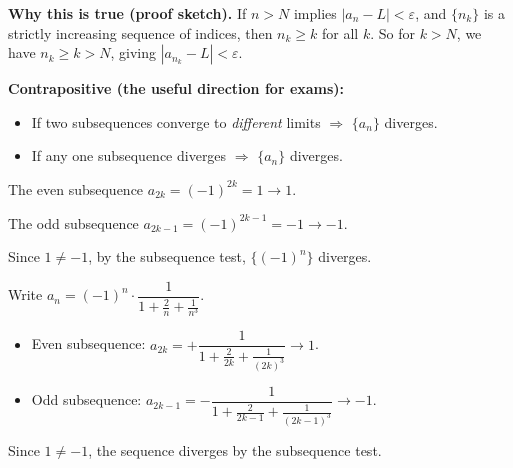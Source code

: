 \noindent
\textbf{Why this is true (proof sketch).}
If $n>N$ implies $|a_n-L|<\varepsilon$, and $\{n_k\}$ is a strictly increasing sequence of indices, then $n_k\ge k$ for all $k$.
So for $k>N$, we have $n_k\ge k>N$, giving $|a_{n_k}-L|<\varepsilon$.

\noindent
\textbf{Contrapositive (the useful direction for exams):}

\begin{itemize}[leftmargin=*]
\item If two subsequences converge to \emph{different} limits $\Rightarrow$ $\{a_n\}$ diverges.
\item If any one subsequence diverges $\Rightarrow$ $\{a_n\}$ diverges.
\end{itemize}

\begin{examplebox}[title={Worked Example: $\{(-1)^n\}$ diverges (Lecture Example 4.4)}]

The even subsequence $a_{2k}=(-1)^{2k}=1\to 1$.

The odd subsequence $a_{2k-1}=(-1)^{2k-1}=-1\to -1$.

Since $1\ne -1$, by the subsequence test, $\{(-1)^n\}$ diverges.

\end{examplebox}

\begin{examplebox}[title={Worked Example (Tutorial 7, Question 2(vii)): subsequence test for $\frac{(-1)^n n^3}{n^3+2n^2+1}$}]

Write $a_n=(-1)^n\cdot \dfrac{1}{1+\frac{2}{n}+\frac{1}{n^3}}$.

\begin{itemize}[leftmargin=*]
\item Even subsequence: $a_{2k}=+\dfrac{1}{1+\frac{2}{2k}+\frac{1}{(2k)^3}}\to 1$.
\item Odd subsequence: $a_{2k-1}=-\dfrac{1}{1+\frac{2}{2k-1}+\frac{1}{(2k-1)^3}}\to -1$.
\end{itemize}

Since $1\ne -1$, the sequence diverges by the subsequence test.

\end{examplebox}

